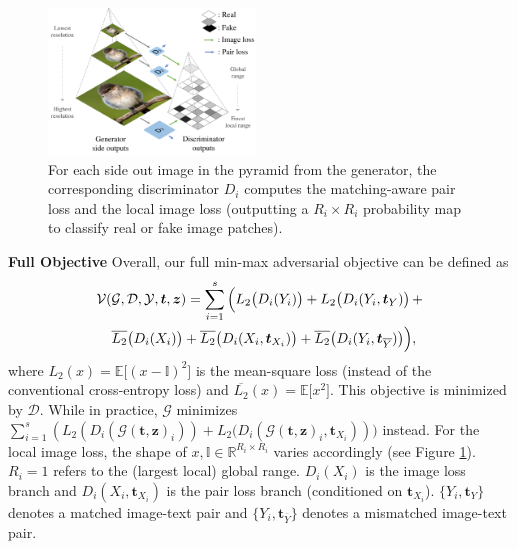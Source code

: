 \documentclass[10pt,twocolumn,letterpaper]{article}
\begin{document}


\begin{figure}[t]
    \centering
    \includegraphics[width=0.49\textwidth]{figure/loss.pdf}
    \vspace{-.7cm}
    \caption{For each side out image in the pyramid from the generator, the corresponding discriminator $D_i$ computes the matching-aware pair loss and the local image loss (outputting a $R_i{\times}R_i$ probability map to classify real or fake image patches). }  \vspace{-.4cm}
    \label{fig:loss}
\end{figure}


\textbf{Full Objective } Overall, our full min-max adversarial objective can be defined as 
\vspace{-.2cm}
\begin{equation}
\begin{split}
\mathcal{V}(& \mathcal{G},\mathcal{D}, \mathcal{Y}, \bm t, \bm z) = \sum_{i=1}^{s} \Big(  L_2\big(D_i({Y}_i)\big) +  L_2\big(D_i({Y}_i, \bm t_{Y})\big) \, + \\ 
& \overline{L_2}\big(D_i({X}_i)\big)  + \overline{L_2}\big(D_i({X}_i, \bm{t}_{X_i})\big) + \overline{L_2}\big(D_i({Y}_i,  \bm{t}_{\overline{Y}})\big) \Big),
\end{split} \vspace{-.6cm}
\end{equation}
where $L_2(x) = \mathbb{E}\big[(x - \mathbb{I})^2\big]$ is the mean-square loss (instead of the conventional cross-entropy loss) and $\overline{L_2}(x) =\mathbb{E}\big[x^2\big]$. 
This objective is minimized by $\mathcal{D}$. While in practice, $\mathcal{G}$ minimizes
$\sum_{i=1}^{s} (L_2(D_i(\mathcal{G}(\bm t, \bm z)_i)) +  L_2\big(D_i(\mathcal{G}(\bm t, \bm z)_i, \bm{t}_{X_i})))$ instead.
For the local image loss, the shape of $x, \mathbb{I} \in \mathbb{R}^{R_i{\times}R_i}$ varies accordingly (see Figure \ref{fig:loss}). $R_i=1$ refers to the (largest local) global range. $D_i(X_i)$ is the image loss branch and $D_i(X_i, \bm{t}_{X_i})$ is the pair loss branch (conditioned on $\bm{t}_{X_i}$).
$\{Y_i, \bm t_{Y}\}$ denotes a matched image-text pair and $\{Y_i, \bm{t}_{\overline{Y}}\}$ denotes a mismatched image-text pair. 
\end{document}
